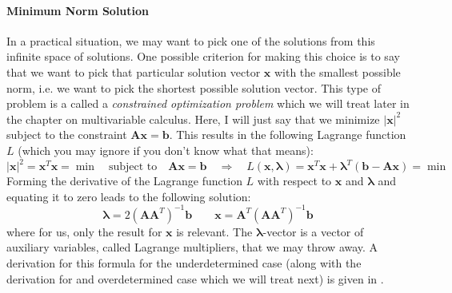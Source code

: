 \paragraph{Minimum Norm Solution}
In a practical situation, we may want to pick one of the solutions from this infinite space of solutions. One possible criterion for making this choice is to say that we want to pick that particular solution vector $\mathbf{x}$ with the smallest possible norm, i.e. we want to pick the shortest possible solution vector. This type of problem is a called a \emph{constrained optimization problem} which we will treat later in the chapter on multivariable calculus. Here, I will just say that we minimize $|\mathbf{x}|^2$ subject to the constraint $\mathbf{A x} = \mathbf{b}$. This results in the following Lagrange function $L$ (which you may ignore if you don't know what that means):
\begin{equation}
|\mathbf{x}|^2 = \mathbf{x}^T \mathbf{x} = \min 
\quad \text{subject to} \quad 
\mathbf{A x} = \mathbf{b}
\quad \Rightarrow \quad
L(\mathbf{x}, \boldsymbol{\lambda}) 
= \mathbf{x}^T \mathbf{x} + \boldsymbol{\lambda}^T (\mathbf{b} - \mathbf{A x}) = \min
\end{equation}
Forming the derivative of the Lagrange function $L$ with respect to $\mathbf{x}$ and $\boldsymbol{\lambda}$ and equating it to zero leads to the following solution:
\begin{equation}
\boldsymbol{\lambda} = 2 (\mathbf{A} \mathbf{A}^T)^{-1} \mathbf{b}
\qquad
\boxed{\mathbf{x} = \mathbf{A}^T (\mathbf{A} \mathbf{A}^T)^{-1} \mathbf{b}}
\end{equation}
where for us, only the result for $\mathbf{x}$ is relevant. The $\boldsymbol{\lambda}$-vector is a vector of auxiliary variables, called Lagrange multipliers, that we may throw away. A derivation for this formula for the underdetermined case (along with the derivation for and overdetermined case which we will treat next) is given in \cite{LinSysOverUnder}.





